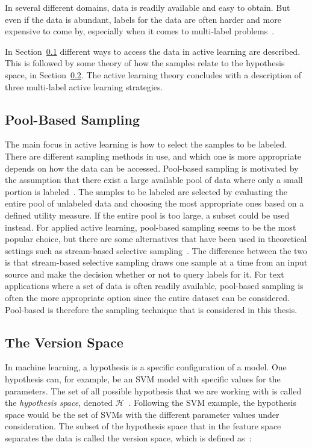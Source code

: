 In several different domains, data is readily available and easy to obtain.
But even if the data is abundant, labels for the data are often harder and more expensive to come by, especially when it comes to multi-label problems~\cite{settles2012active}.

In Section~\ref{sec:pool-based-sampling} different ways to access the data in active learning are described.
This is followed by some theory of how the samples relate to the hypothesis space, in Section~\ref{sec:the-version-space}.
The active learning theory concludes with a description of three multi-label active learning strategies.

\subsection{Pool-Based Sampling}
\label{sec:pool-based-sampling}

The main focus in active learning is how to select the samples to be labeled.
There are different sampling methods in use, and which one is more appropriate depends on how the data can be accessed.
Pool-based sampling is motivated by the assumption that there exist a large available pool of data where only a small portion is labeled~\cite{lewis1994sequential, settles2012active}.
The samples to be labeled are selected by evaluating the entire pool of unlabeled data and choosing the most appropriate ones based on a defined utility measure.
If the entire pool is too large, a subset could be used instead.
For applied active learning, pool-based sampling seems to be the most popular choice, but there are some alternatives that have been used in theoretical settings such as stream-based selective sampling~\cite{li2013active}.
The difference between the two is that stream-based selective sampling draws one sample at a time from an input source and make the decision whether or not to query labels for it.
For text applications where a set of data is often readily available, pool-based sampling is often the more appropriate option since the entire dataset can be considered.
Pool-based is therefore the sampling technique that is considered in this thesis.

\subsection{The Version Space}
\label{sec:the-version-space}

In machine learning, a hypothesis is a specific configuration of a model.
One hypothesis can, for example, be an SVM model with specific values for the parameters.
The set of all possible hypothesis that we are working with is called the \textit{hypothesis space}, denoted $\mathcal{H}$~\cite{russell2016artificial}.
Following the SVM example, the hypothesis space would be the set of SVMs with the different parameter values under consideration.
The subset of the hypothesis space that in the feature space separates the data is called the version space, which is defined as~\cite{settles2012active,tong2001support}:


